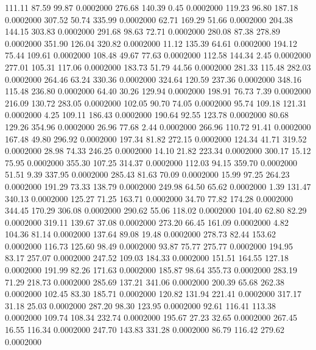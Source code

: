  111.11   87.59   99.87   0.0002000
 276.68  140.39    0.45   0.0002000
 119.23   96.80  187.18   0.0002000
 307.52   50.74  335.99   0.0002000
  62.71  169.29   51.66   0.0002000
 204.38  144.15  303.83   0.0002000
 291.68   98.63   72.71   0.0002000
 280.08   87.38  278.89   0.0002000
 351.90  126.04  320.82   0.0002000
  11.12  135.39   64.61   0.0002000
 194.12   75.44  109.61   0.0002000
 108.48   49.67   77.63   0.0002000
 112.58  144.34    2.45   0.0002000
 277.01  105.31  117.06   0.0002000
 183.73   51.79   44.56   0.0002000
 281.33  115.48  282.03   0.0002000
 264.46   63.24  330.36   0.0002000
 324.64  120.59  237.36   0.0002000
 348.16  115.48  236.80   0.0002000
  64.40   30.26  129.94   0.0002000
 198.91   76.73    7.39   0.0002000
 216.09  130.72  283.05   0.0002000
 102.05   90.70   74.05   0.0002000
  95.74  109.18  121.31   0.0002000
   4.25  109.11  186.43   0.0002000
 190.64   92.55  123.78   0.0002000
  80.68  129.26  354.96   0.0002000
  26.96   77.68    2.44   0.0002000
 266.96  110.72   91.41   0.0002000
 167.48   49.80  296.92   0.0002000
 197.34   81.82  272.15   0.0002000
 124.34   41.71  319.52   0.0002000
  28.98   74.33  246.25   0.0002000
  14.10   21.82  223.34   0.0002000
 300.17   15.12   75.95   0.0002000
 355.30  107.25  314.37   0.0002000
 112.03   94.15  359.70   0.0002000
  51.51    9.39  337.95   0.0002000
 285.43   81.63   70.09   0.0002000
  15.99   97.25  264.23   0.0002000
 191.29   73.33  138.79   0.0002000
 249.98   64.50   65.62   0.0002000
   1.39  131.47  340.13   0.0002000
 125.27   71.25  163.71   0.0002000
  34.70   77.82  174.28   0.0002000
 344.45  170.29  306.08   0.0002000
 290.62   55.06  118.02   0.0002000
 104.40   62.80   82.29   0.0002000
 319.11  139.67   37.08   0.0002000
 273.20   66.45  161.09   0.0002000
   4.82  104.36   81.14   0.0002000
 137.64   89.08   19.48   0.0002000
 278.73   82.44  153.62   0.0002000
 116.73  125.60   98.49   0.0002000
  93.87   75.77  275.77   0.0002000
 194.95   83.17  257.07   0.0002000
 247.52  109.03  184.33   0.0002000
 151.51  164.55  127.18   0.0002000
 191.99   82.26  171.63   0.0002000
 185.87   98.64  355.73   0.0002000
 283.19   71.29  218.73   0.0002000
 285.69  137.21  341.06   0.0002000
 200.39   65.68  262.38   0.0002000
 102.45   83.30  185.71   0.0002000
 120.82  131.94  221.41   0.0002000
 317.17   31.18   25.03   0.0002000
 287.20   98.30  123.95   0.0002000
  92.61  116.41  113.38   0.0002000
 109.74  108.34  232.74   0.0002000
 195.67   27.23   32.65   0.0002000
 267.45   16.55  116.34   0.0002000
 247.70  143.83  331.28   0.0002000
  86.79  116.42  279.62   0.0002000
